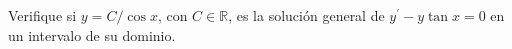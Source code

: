 Verifique si $y=C/\cos x$, con $C\in\mathbb R$, es la solución general de $y^{\prime}-y\tan x=0$ en un intervalo de su dominio.
